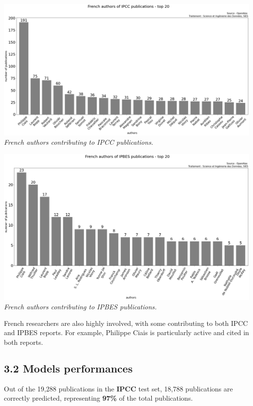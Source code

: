 \documentclass[
]{article}
\begin{document}
\includegraphics{./images/teds_ipcc_authors.png} \emph{French authors
contributing to IPCC publications.}

\includegraphics{./images/teds_ipbes_authors.png} \emph{French authors
contributing to IPBES publications.}

French researchers are also highly involved, with some contributing to
both IPCC and IPBES reports. For example, Philippe Ciais is particularly
active and cited in both reports.

\hypertarget{models-performances}{%
\subsection{3.2 Models performances}\label{models-performances}}

Out of the 19,288 publications in the \textbf{IPCC} test set, 18,788
publications are correctly predicted, representing \textbf{97\%} of the
total publications.
\end{document}
